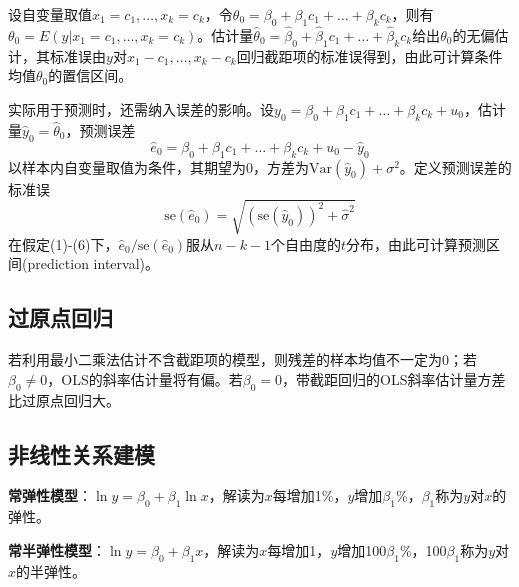 \par 设自变量取值$x_1=c_1,\dots,x_k=c_k$，令$\theta_0=\beta_0+\beta_1 c_1+\dots+\beta_k c_k$，则有$\theta_0=E(y\vert x_1=c_1,\dots,x_k=c_k)$。估计量$\hat{\theta}_0=\hat{\beta}_0+\hat{\beta}_1 c_1+\dots+\hat{\beta}_k c_k$给出$\theta_0$的无偏估计，其标准误由$y$对$x_1-c_1,\dots,x_k-c_k$回归截距项的标准误得到，由此可计算条件均值$\theta_0$的置信区间。

\par 实际用于预测时，还需纳入误差的影响。设$y_0=\beta_0+\beta_1 c_1+\dots+\beta_k c_k+u_0$，估计量$\hat{y}_0=\hat{\theta}_0$，预测误差
\begin{equation}
    \hat{e}_0=\beta_0+\beta_1 c_1+\dots+\beta_k c_k+u_0-\hat{y}_0
\end{equation}
以样本内自变量取值为条件，其期望为0，方差为$\text{Var}(\hat{y}_0)+\sigma^2$。定义预测误差的标准误
\begin{equation}
    \text{se}(\hat{e}_0)=\sqrt{(\text{se}(\hat{y}_0))^2+\hat{\sigma}^2}
\end{equation}
在假定(1)-(6)下，$\hat{e}_0/\text{se}(\hat{e}_0)$服从$n-k-1$个自由度的$t$分布，由此可计算预测区间(prediction interval)。

\subsection{过原点回归}
\par 若利用最小二乘法估计不含截距项的模型，则残差的样本均值不一定为0；若$\beta_0\neq 0$，OLS的斜率估计量将有偏。若$\beta_0=0$，带截距回归的OLS斜率估计量方差比过原点回归大。

\subsection{非线性关系建模}
\par \textbf{常弹性模型}：$\ln y=\beta_0+\beta_1 \ln x$，解读为$x$每增加1\%，$y$增加$\beta_1$\%，$\beta_1$称为$y$对$x$的弹性。

\par \textbf{常半弹性模型}：$\ln y=\beta_0+\beta_1 x$，解读为$x$每增加1，$y$增加100$\beta_1$\%，100$\beta_1$称为$y$对$x$的半弹性。

